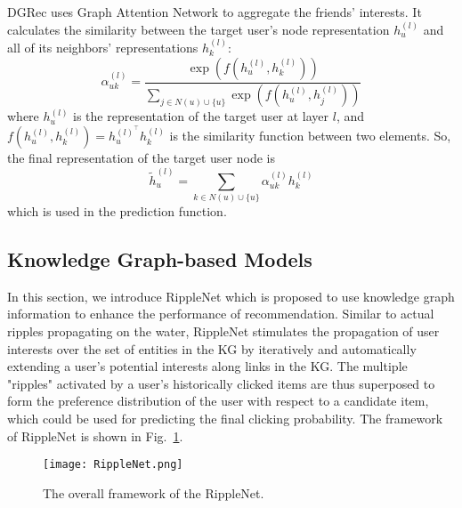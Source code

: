 DGRec uses Graph Attention Network to aggregate the friends' interests.
It calculates the similarity between the target user's node 
representation $h_u^{(l)}$ and all of its neighbors' representations $h_k^{(l)}$:
\begin{equation}
    \alpha_{u k}^{(l)}=\frac{\exp \left(f\left(h_{u}^{(l)}, h_{k}^{(l)}\right)\right)}{\sum_{j \in N(u) \cup\{u\}} \exp \left(f\left(h_{u}^{(l)}, h_{j}^{(l)}\right)\right)}
\end{equation}
where $h_u^{(l)}$ is the representation of the target user at layer $l$, and
$f\left(h_{u}^{(l)}, h_{k}^{(l)}\right)=h_{u}^{(l)^{\top}} h_{k}^{(l)}$ is the 
similarity function between two elements. So, the final representation of the 
target user node is 
\begin{equation}
    \tilde{h}_{u}^{(l)}=\sum_{k \in N(u) \cup\{u\}} \alpha_{u k}^{(l)} h_{k}^{(l)}
\end{equation}
which is used in the prediction function.

\subsection{Knowledge Graph-based Models}
In this section, we introduce RippleNet \cite{wang2018ripplenet} which is proposed
to use knowledge graph information to enhance the performance of recommendation.
Similar to actual ripples propagating on the water, RippleNet stimulates 
the propagation of user interests over the set of entities in the KG
by iteratively and automatically extending a user’s potential interests 
along links in the KG. The multiple "ripples" activated by 
a user’s historically clicked items are thus superposed to form the 
preference distribution of the user with respect to a candidate item, 
which could be used for predicting the final clicking probability.
The framework of RippleNet is shown in Fig.~\ref{fig:ripplenet}.
\begin{figure}[h]
	\centering
	\texttt{[image: RippleNet.png]}
	\caption{The overall framework of the RippleNet.}
	\label{fig:ripplenet}
	\vspace{-10pt}
\end{figure}

